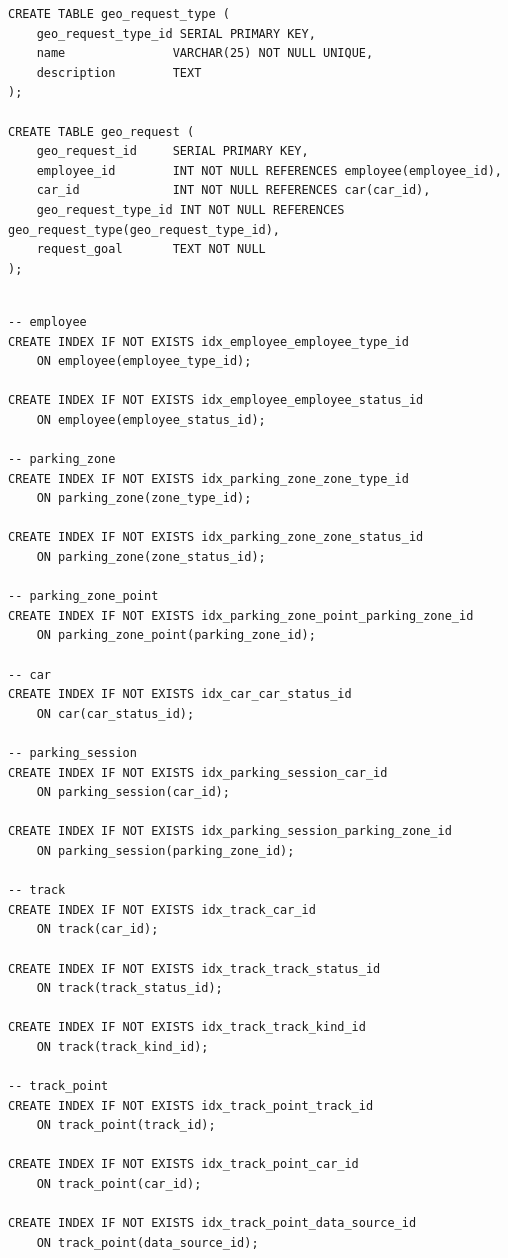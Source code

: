 \begin{lstlisting}[style=sqlstyle, caption={SQL-скрипт для создания схемы базы данных}, label={lst:schema}]
CREATE TABLE geo_request_type (
    geo_request_type_id SERIAL PRIMARY KEY,
    name               VARCHAR(25) NOT NULL UNIQUE,
    description        TEXT
);

CREATE TABLE geo_request (
    geo_request_id     SERIAL PRIMARY KEY,
    employee_id        INT NOT NULL REFERENCES employee(employee_id),
    car_id             INT NOT NULL REFERENCES car(car_id),
    geo_request_type_id INT NOT NULL REFERENCES geo_request_type(geo_request_type_id),
    request_goal       TEXT NOT NULL
);


\end{lstlisting}

\begin{lstlisting}[style=sqlstyle, caption={SQL-скрипт для создания индексов}, label={lst:schema}]
-- employee
CREATE INDEX IF NOT EXISTS idx_employee_employee_type_id
  	ON employee(employee_type_id);

CREATE INDEX IF NOT EXISTS idx_employee_employee_status_id
  	ON employee(employee_status_id);

-- parking_zone
CREATE INDEX IF NOT EXISTS idx_parking_zone_zone_type_id
  	ON parking_zone(zone_type_id);

CREATE INDEX IF NOT EXISTS idx_parking_zone_zone_status_id
  	ON parking_zone(zone_status_id);

-- parking_zone_point
CREATE INDEX IF NOT EXISTS idx_parking_zone_point_parking_zone_id
  	ON parking_zone_point(parking_zone_id);

-- car
CREATE INDEX IF NOT EXISTS idx_car_car_status_id
  	ON car(car_status_id);

-- parking_session
CREATE INDEX IF NOT EXISTS idx_parking_session_car_id
  	ON parking_session(car_id);

CREATE INDEX IF NOT EXISTS idx_parking_session_parking_zone_id
  	ON parking_session(parking_zone_id);

-- track
CREATE INDEX IF NOT EXISTS idx_track_car_id
  	ON track(car_id);

CREATE INDEX IF NOT EXISTS idx_track_track_status_id
  	ON track(track_status_id);

CREATE INDEX IF NOT EXISTS idx_track_track_kind_id
  	ON track(track_kind_id);

-- track_point
CREATE INDEX IF NOT EXISTS idx_track_point_track_id
  	ON track_point(track_id);

CREATE INDEX IF NOT EXISTS idx_track_point_car_id
  	ON track_point(car_id);

CREATE INDEX IF NOT EXISTS idx_track_point_data_source_id
  	ON track_point(data_source_id);


\end{lstlisting}

